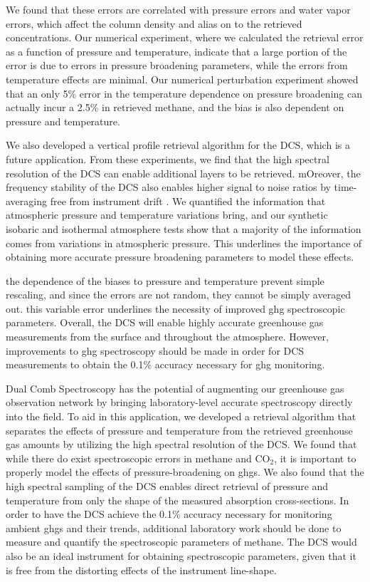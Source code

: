 \documentclass[amt, manuscript]{copernicus}
\begin{document}
We found that these errors are correlated with pressure errors and water vapor errors, which affect the column density and alias on to the retrieved concentrations. Our numerical experiment, where we calculated the retrieval error as a function of pressure and temperature, indicate that a large portion of the error is due to errors in pressure broadening parameters, while the errors from temperature effects are minimal. Our numerical perturbation experiment showed that an only 5\% error in the temperature dependence on pressure broadening can actually incur a 2.5\% in retrieved methane, and the bias is also dependent on pressure and temperature.

We also developed a vertical profile retrieval algorithm for the DCS, which is a future application. From these experiments, we find that the high spectral resolution of the DCS can enable additional layers to be retrieved. mOreover, the frequency stability of the DCS also enables higher signal to noise ratios by time-averaging free from instrument drift . We quantified the information that atmospheric pressure and temperature variations bring, and our synthetic isobaric and isothermal atmosphere tests show that a majority of the information comes from variations in atmospheric pressure. This underlines the importance of obtaining more accurate pressure broadening parameters to model these effects.

the dependence of the biases to pressure and temperature prevent simple rescaling, and since the errors are not random, they cannot be simply averaged out. this variable error underlines the necessity of improved ghg spectroscopic parameters. Overall, the DCS will enable highly accurate greenhouse gas measurements from the surface and throughout the atmosphere. However, improvements to  ghg spectroscopy should be made in order for DCS measurements to obtain the 0.1\% accuracy necessary for ghg monitoring. 




\conclusions  %
Dual Comb Spectroscopy has the potential of augmenting our greenhouse gas observation network by bringing laboratory-level accurate spectroscopy directly into the field. To aid in this application, we developed a retrieval algorithm that separates the effects of pressure and temperature from the retrieved greenhouse gas amounts by utilizing the high spectral resolution of the DCS. We found that while there do exist spectroscopic errors in methane and CO$_2$, it is important to properly model the effects of pressure-broadening on ghgs. We also found that the high spectral sampling of the DCS enables direct retrieval of pressure and temperature from only the shape of the measured absorption cross-sections. In order to have the DCS achieve the 0.1\% accuracy necessary for monitoring ambient ghgs and their trends, additional laboratory work should be done to measure and quantify the spectroscopic parameters of methane. The DCS would also be an ideal instrument for obtaining spectroscopic parameters, given that it is free from the distorting effects of the instrument line-shape.
\end{document}
